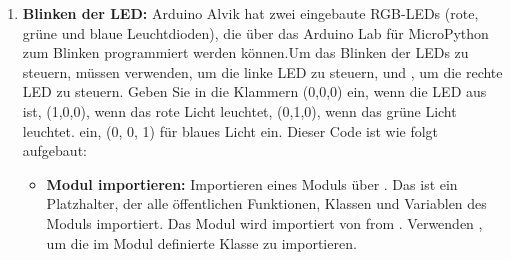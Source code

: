 \begin{enumerate}
	\item \textbf{Blinken der LED:} Arduino Alvik hat zwei eingebaute RGB-LEDs (rote, grüne und blaue Leuchtdioden), die über das Arduino Lab für MicroPython zum Blinken programmiert werden können.Um das Blinken der LEDs zu steuern, müssen  verwenden, um die linke LED zu steuern, und , um die rechte LED zu steuern. Geben Sie in die Klammern (0,0,0) ein, wenn die LED aus ist, (1,0,0), wenn das rote Licht leuchtet, (0,1,0), wenn das grüne Licht leuchtet. ein, (0, 0, 1) für blaues Licht ein. \cite{Paolo:2025} 
	{
		\label{blinkcode}	
		{	\pythonstyle
			}
	}
	Dieser Code ist wie folgt aufgebaut:
	\begin{itemize}
		\item \textbf{Modul importieren:} Importieren eines  Moduls über . Das \PYTHON{*} ist ein Platzhalter, der alle öffentlichen Funktionen, Klassen und Variablen des Moduls importiert. Das Modul  wird importiert von from . Verwenden , um die im Modul definierte Klasse  zu importieren.

\end{itemize}
\end{enumerate}
